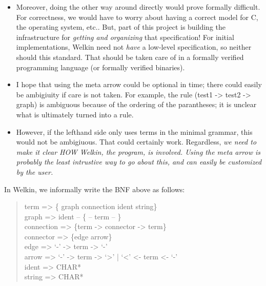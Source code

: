 \begin{itemize}
\begin{itemize}
					\item Moreover, doing the other way around directly would prove formally difficult. For correctness, we would have to worry about having a correct model for C, the operating system, etc.. But, part of this project is building the infrastructure for \textit{getting and organizing} that specification! For initial implementations, Welkin need not \textit{have} a low-level specification, so neither should this standard. That should be taken care of in a formally verified programming language (or formally verified binaries).
					\item I hope that using the meta arrow could be optional in time; there could easily be ambigiuity if
								care is not taken. For example, the rule (test1 -> test2 -> graph) is ambiguous because of the ordering of the parantheses; it is unclear what is ultimately turned into a rule.
					\item However, if the lefthand side only uses terms in the minimal grammar, this would not be ambigiuous. That could certainly work. Regardless, \textit{we need to make it clear HOW Welkin, the program, is involved. Using the meta arrow is probably the least intrustive way to go about this, and can easily be customized by the user.}
				\end{itemize}


\end{itemize}

In Welkin, we informally write the BNF above as follows:
\begin{quote}{\ttfamily \raggedright \noindent
	term => \{ graph connection ident string\}\\
	graph => {ident} -- \{ -- term -- \}\\
	connection => \{term -> connector -> term\}\\
	connector => \{edge arrow\}\\
	edge => `-' -> term -> `-' \\
	arrow =>  `-' -> term -> `>' | `<' <- term <- `-' \\
	ident => CHAR*\\
    string => CHAR*\\
}\end{quote}

